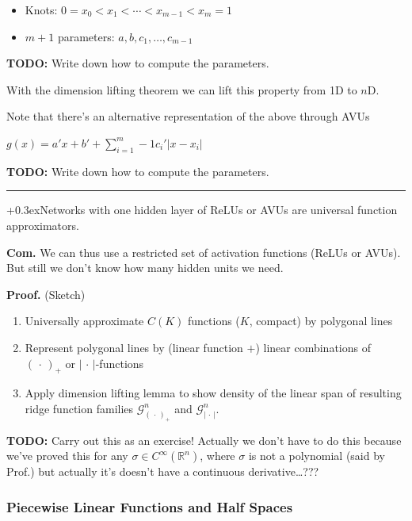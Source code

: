 \documentclass[a2paper,8pt]{extarticle}
\newcommand{\R}{\mathbb{R}}
\newcommand{\cG}{\mathcal{G}}
\newcommand{\abs}[1]{\left\lvert #1 \right\rvert}
\newcommand{\argdot}{\,\cdot\,}
\newcommand{\todo}[1]{\textbf{TODO:} #1}
\newcommand{\todo}[1]{%
}
\newcommand{\customboxpaddingsize}{0pt}
\newcommand{\emptyarg}[1][]{\ifthenelse{\isempty{#1}}{}{\ (#1)}}
\newcommand{\Thm}[1][]{{\setlength\fboxsep{\customboxpaddingsize}
\colorbox{thmcolor}{%
\color{custtitlecolor}{\textbf{T.\emptyarg[#1]}}}\kern+0.3ex}}
\newcommand{\Com}{\textbf{Com.} }
\newcommand{\Proof}{\textbf{Proof.} }
\newcommand{\sep}{\vspace{0pt}\noindent\hrule\vspace{0pt}}
\newcommand{\ssep}{\hdashrule[1.1ex]{\linewidth}{0.1pt}{0.3mm}\vspace{-6pt}}
\newcommand{\sep}{\vspace{5pt}\noindent\hrule\vspace{5pt}}
\newcommand{\ssep}{\hdashrule[1.1ex]{\linewidth}{0.1pt}{0.3mm}\vspace{-3pt}}
\begin{document}
\begin{landscape}
\begin{multicols*}{7}
\begin{itemize}
  \item Knots: $0=x_0<x_1<\cdots <x_{m-1}<x_{m}=1$
  \item $m+1$ parameters: $a,b,c_1,\ldots,c_{m-1}$
\end{itemize}

\todo{Write down how to compute the parameters}.

With the dimension lifting theorem we can lift this property from 1D to $n$D.

\ssep

Note that there's an alternative representation of the above through AVUs

$
g(x)=a'x+b'+\sum_{i=1}^m-1 c_i'\abs{x-x_i}
$

\todo{Write down how to compute the parameters}.

\sep

\Thm Networks with one hidden layer of ReLUs or AVUs are universal function
approximators.

\Com We can thus use a restricted set of activation functions (ReLUs or AVUs).
But still we don't know how many hidden units we need.

\Proof (Sketch)

\begin{enumerate}
  \item Universally approximate $C(K)$ functions ($K$, compact) by polygonal
  lines
  \item Represent polygonal lines by (linear function $+$) linear combinations
  of $(\argdot)_+$ or $\abs{\argdot}$-functions
  \item Apply dimension lifting lemma to show density of the linear span of
  resulting ridge function families $\cG_{(\argdot)_{+}}^n$ and
  $\cG_{\abs{\argdot}}^n$.
\end{enumerate}

\todo{Carry out this as an exercise! Actually we don't have to do this because
we've proved this for any $\sigma\in C^{\infty}(\R^n)$, where $\sigma$ is not a
polynomial (said by Prof.) but actually it's doesn't have a continuous
derivative\ldots???}

\subsubsection{Piecewise Linear Functions and Half Spaces}


\end{multicols*}
\end{landscape}
\end{document}
